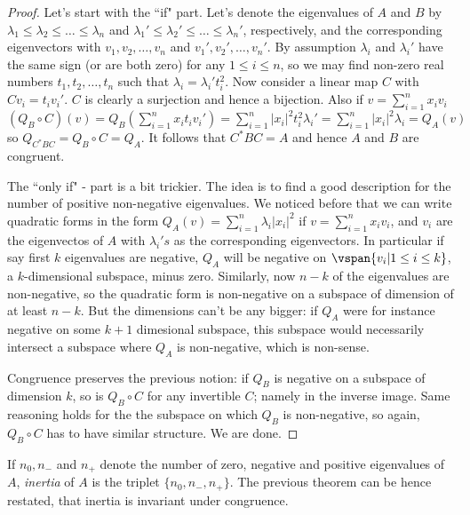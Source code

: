 \begin{proof}
	Let's start with the ``if" part. Let's denote the eigenvalues of $A$ and $B$ by $\lambda_{1} \leq \lambda _{2} \leq \ldots \leq \lambda_{n}$ and $\lambda_{1}' \leq \lambda _{2}' \leq \ldots \leq \lambda_{n}'$, respectively, and the corresponding eigenvectors with $v_{1}, v_{2}, \ldots, v_{n}$ and $v_{1}', v_{2}', \ldots, v_{n}'$. By assumption $\lambda_{i}$ and $\lambda_{i}'$ have the same sign (or are both zero) for any $1 \leq i \leq n$, so we may find non-zero real numbers $t_{1}, t_{2}, \ldots, t_{n}$ such that $\lambda_{i} = \lambda_{i}' t_{i}^{2}$. Now consider a linear map $C$ with $C v_{i} = t_{i} v_{i}'$. $C$ is clearly a surjection and hence a bijection. Also if $v = \sum_{i = 1}^{n} x_{i} v_{i}$ $(Q_{B} \circ C)(v) = Q_{B}(\sum_{i = 1}^{n} x_{i} t_{i} v_{i}') = \sum_{i = 1}^{n} |x_{i}|^{2} t_{i}^2 \lambda_{i}' = \sum_{i = 1}^{n} |x_{i}|^{2} \lambda_{i} = Q_{A}(v)$ so $Q_{C^{*}BC} = Q_{B} \circ C = Q_{A}$. It follows that $C^{*}BC = A$ and hence $A$ and $B$ are congruent.

	The ``only if" - part is a bit trickier. The idea is to find a good description for the number of positive non-negative eigenvalues. We noticed before that we can write quadratic forms in the form $Q_{A}(v) = \sum_{i = 1}^{n} \lambda_{i} |x_{i}|^{2}$ if $v = \sum_{i = 1}^{n} x_{i}v_{i}$, and $v_{i}$ are the eigenvectos of $A$ with $\lambda_{i}'s$ as the corresponding eigenvectors. In particular if say first $k$ eigenvalues are negative, $Q_{A}$ will be negative on $\vspan\{v_{i} | 1 \leq i \leq k\}$, a $k$-dimensional subspace, minus zero. Similarly, now $n - k$ of the eigenvalues are non-negative, so the quadratic form is non-negative on a subspace of dimension of at least $n - k$. But the dimensions can't be any bigger: if $Q_{A}$ were for instance negative on some $k + 1$ dimesional subspace, this subspace would necessarily intersect a subspace where $Q_{A}$ is non-negative, which is non-sense.

	Congruence preserves the previous notion: if $Q_{B}$ is negative on a subspace of dimension $k$, so is $Q_{B} \circ C$ for any invertible $C$; namely in the inverse image. Same reasoning holds for the the subspace on which $Q_{B}$ is non-negative, so again, $Q_{B} \circ C$ has to have similar structure. We are done.
\end{proof}

If $n_{0}, n_{-}$ and $n_{+}$ denote the number of zero, negative and positive eigenvalues of $A$, \textit{inertia} of $A$ is the triplet $\{n_{0}, n_{-}, n_{+} \}$. The previous theorem can be hence restated, that inertia is invariant under congruence.

